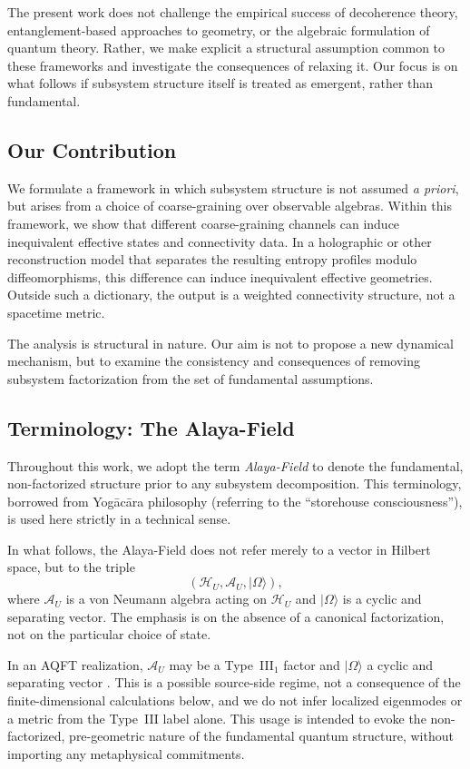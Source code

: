 \documentclass[12pt,a4paper,openany]{book}
\begin{document}
The present work does not challenge the empirical success of decoherence theory, entanglement-based approaches to geometry, or the algebraic formulation of quantum theory.
Rather, we make explicit a structural assumption common to these frameworks and investigate the consequences of relaxing it.
Our focus is on what follows if subsystem structure itself is treated as emergent, rather than fundamental.

\subsection{Our Contribution}

We formulate a framework in which subsystem structure is not assumed \emph{a priori}, but arises from a choice of coarse-graining over observable algebras.
Within this framework, we show that different coarse-graining channels can induce inequivalent effective states and connectivity data.  In a holographic or other reconstruction model that separates the resulting entropy profiles modulo diffeomorphisms, this difference can induce inequivalent effective geometries.  Outside such a dictionary, the output is a weighted connectivity structure, not a spacetime metric.

The analysis is structural in nature.
Our aim is not to propose a new dynamical mechanism, but to examine the consistency and consequences of removing subsystem factorization from the set of fundamental assumptions.

\subsection{Terminology: The Alaya-Field}

Throughout this work, we adopt the term \emph{Alaya-Field} to denote the fundamental, non-factorized structure prior to any subsystem decomposition.
This terminology, borrowed from Yogācāra philosophy (referring to the ``storehouse consciousness''), is used here strictly in a technical sense.

In what follows, the Alaya-Field does not refer merely to a vector in Hilbert space, but to the triple
\[
(\mathcal{H}_U, \mathcal{A}_U, |\Omega\rangle),
\]
where $\mathcal{A}_U$ is a von Neumann algebra acting on $\mathcal{H}_U$ and $|\Omega\rangle$ is a cyclic and separating vector.
The emphasis is on the absence of a canonical factorization, not on the particular choice of state.

In an AQFT realization, $\mathcal A_U$ may be a Type~III$_1$ factor and $|\Omega\rangle$ a cyclic and separating vector \cite{Haag1996}.  This is a possible source-side regime, not a consequence of the finite-dimensional calculations below, and we do not infer localized eigenmodes or a metric from the Type~III label alone.
This usage is intended to evoke the non-factorized, pre-geometric nature of the fundamental quantum structure, without importing any metaphysical commitments.
\end{document}
